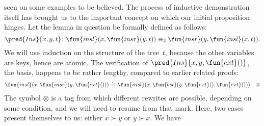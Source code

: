 seen on some examples to be believed. The process of inductive
demonstration itself has brought us to the important concept on which
our initial proposition hinges. Let the lemma in question be formally
defined as follows:
\begin{equation*}
\pred{Ins}{x,y,t} \colon \fun{insl}(x,\fun{insr}(y,t))
\equiv_2 \fun{insr}(y,\fun{insl}(x,t)).
\index{Ins@\predName{Ins}}
\end{equation*}
We will use induction on the structure of the tree~\(t\), because the
other variables are keys, hence are atomic. The verification of
\(\pred{Ins}{x,y,\fun{ext}()}\), the basis, happens to be rather
lengthy, compared to earlier related proofs:
\begin{equation*}
\begin{array}{@{}r@{\;}l@{\;}l@{\quad}r@{}}
  \fun{insl}(x,\fun{insr}(y,\fun{ext}()))
& \xrightarrow{\smash{\iota}} &
  \fun{insl}(x,\fun{bst}(y,\fun{ext}(),\fun{ext}())) & \otimes
\end{array}
\end{equation*}
The symbol \(\otimes\) is a tag from which different rewrites are
possible, depending on some condition, and we will need to resume from
that mark. Here, two cases present themselves to us: either \(x \succ
y\) or \(y \succ x\). We have
